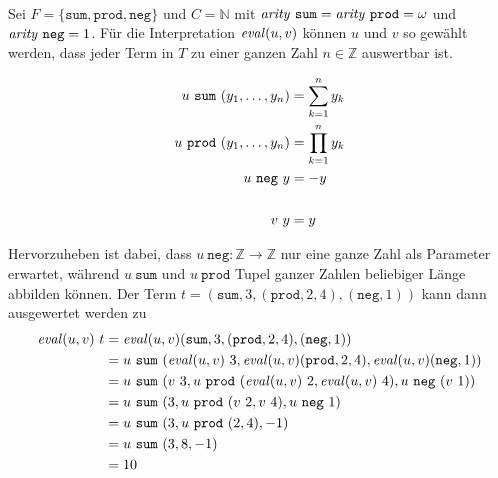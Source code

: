 \begin{beispiel}~\\ \label{bEval}
Sei $F = \{\texttt{sum}, \texttt{prod}, \texttt{neg} \}$ und $C = \mathbb{N}$ mit $\mathit{arity}~ \texttt{sum} = \mathit{arity}~ \texttt{prod} = \omega$ und $\mathit{arity}~ \texttt{neg} = 1$.
Für die Interpretation $\mathit{eval}(u, v)$ können $u$ und $v$ so gewählt werden, dass jeder Term in $T$ zu einer ganzen Zahl $n \in \mathbb{Z}$ auswertbar ist.

\begin{equation*}
    \begin{split}
    u~\texttt{sum}  ~({y}_{1}, \dots, {y}_{n}) &=  \sum_{k = 1}^n y_k\\
    u~\texttt{prod} ~({y}_{1}, \dots, {y}_{n}) &= \prod_{k = 1}^n y_k\\
    u~\texttt{neg}~y &= -y\\
    &\\
    v~y &= y
    \end{split}
\end{equation*}

Hervorzuheben ist dabei, dass $u~\texttt{neg} \colon \mathbb Z \rightarrow \mathbb Z$ nur eine ganze Zahl als \Gls{Parameter} erwartet, während $u~\texttt{sum}$ und $u~\texttt{prod}$ Tupel ganzer Zahlen beliebiger Länge abbilden können.
Der Term $t = (\texttt{sum}, 3, (\texttt{prod}, 2, 4), (\texttt{neg}, 1))$ kann dann ausgewertet werden zu 
\begin{equation*}
    \begin{split}
    \mathit{eval}(u, v)~t &= \mathit{eval}(u, v) (\texttt{sum}, 3, (\texttt{prod}, 2, 4), (\texttt{neg}, 1)) \\
    &= u~\texttt{sum}~(\mathit{eval}(u, v)~3, \mathit{eval}(u, v)(\texttt{prod}, 2, 4),  \mathit{eval}(u, v) (\texttt{neg}, 1)) \\
    &= u~\texttt{sum}~(v~3, u~\texttt{prod}~(\mathit{eval}(u, v)~2, \mathit{eval}(u, v)~4), u~\texttt{neg}~ (v~1)) \\
    &= u~\texttt{sum}~(3, u~\texttt{prod}~(v~2, v~4), u~\texttt{neg}~ 1) \\
    &= u~\texttt{sum}~(3, u~\texttt{prod}~(2, 4), -1) \\
    &= u~\texttt{sum}~( 3, 8, -1) \\
    &= 10 \\
    \end{split}
\end{equation*}
\end{beispiel}


